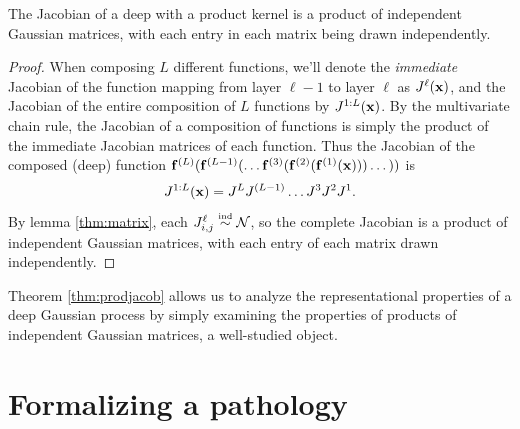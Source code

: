 \documentclass[twoside]{article}
\makeatletter
\newlength{\nonHumbleHeight}
\def\@humbleformat#1{{\settoheight{\nonHumbleHeight}{#1}\resizebox{!}{0.94\nonHumbleHeight}{#1}}}%
\newcommand\humble[1]{{\@humbleformat{#1}}}%
\newcommand{\gp}{{\humble{GP}}}
\newcommand{\layerindex}{\ell}
\newcommand{\sectiondist}{}
\makeatother
\begin{document}
\begin{theorem}
\label{thm:prodjacob}
The Jacobian of a deep \gp{} with a product kernel is a product of independent Gaussian matrices, with each entry in each matrix being drawn independently.
\end{theorem}
%
\begin{proof}
When composing $L$ different functions, we'll denote the \emph{immediate} Jacobian of the function mapping from layer $\layerindex -1$ to layer $\layerindex$ as $J^{\layerindex}(\vx)$, and the Jacobian of the entire composition of $L$ functions by $J^{1:L}({\bf{x}})$.
%
By the multivariate chain rule, the Jacobian of a composition of functions is simply the product of the immediate Jacobian matrices of each function.  
%
Thus the Jacobian of the composed (deep) function ${\bf{f}}^{(L)}({\bf{f}}^{(L-1)}(\dots {\bf{f}}^{(3)}( {\bf{f}}^{(2)}( {\bf{f}}^{(1)}({\bf{x}})))\dots))$ is
%
%
\begin{align}
 J^{1:L}({\bf{x}}) 
= J^L J^{(L-1)} \dots J^3 J^2 J^1. 
\end{align}
%
By lemma \ref{thm:matrix}, each ${J^\layerindex_{i,j} \simind \mathcal{N}}$, so the complete Jacobian is a product of independent Gaussian matrices, with each entry of each matrix drawn independently.
\end{proof}

\vspace{-0.1in}
Theorem \ref{thm:prodjacob} allows us to analyze the representational properties of a deep Gaussian process by simply examining the properties of products of independent Gaussian matrices, a well-studied object.






\section{Formalizing a pathology}
\sectiondist
\label{sec:formalizing-pathology}
\end{document}
